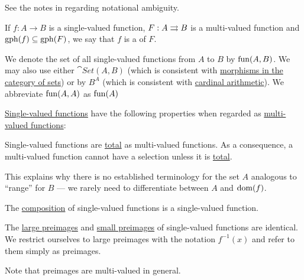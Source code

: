 \begin{definition}
\begin{thmenum}
    See the notes in  regarding notational ambiguity.

     If \( f: A \to B \) is a single-valued function, \( F: A \rightrightarrows B \) is a multi-valued function and \( \operatorname{gph}(f) \subseteq \operatorname{gph}(F) \), we say that \( f \) is a  of \( F \).

     We denote the set of all single-valued functions from \( A \) to \( B \) by \( \operatorname{fun}(A, B) \). We may also use either \( \cat{Set}(A, B) \) (which is consistent with \hyperref[def:category_of_sets]{morphisms in the category of sets}) or by \( B^A \) (which is consistent with \hyperref[def:cardinal_arithmetic]{cardinal arithmetic}). We abbreviate \( \operatorname{fun}(A, A) \) as \( \operatorname{fun}(A) \)
  \end{thmenum}
\end{definition}

\begin{proposition}\label{thm:function_properties}
  \hyperref[def:function]{Single-valued functions} have the following properties when regarded as \hyperref[def:multi_valued_function]{multi-valued functions}:
  \begin{thmenum}
     Single-valued functions are \hyperref[def:multi_valued_function/total]{total} as multi-valued functions. As a consequence, a multi-valued function cannot have a selection unless it is \hyperref[def:multi_valued_function/total]{total}.

    This explains why there is no established terminology for the set \( A \) analogous to \enquote{range} for \( B \) --- we rarely need to differentiate between \( A \) and \( \operatorname{dom}(f) \).

     The \hyperref[def:multi_valued_function/composition]{composition} of single-valued functions is a single-valued function.

     The \hyperref[def:multi_valued_function/large_preimage]{large preimages} and \hyperref[def:multi_valued_function/small_preimage]{small preimages} of single-valued functions are identical. We restrict ourselves to large preimages with the notation \( f^{-1}(x) \) and refer to them simply as preimages.

    Note that preimages are multi-valued in general.
  \end{thmenum}
\end{proposition}

